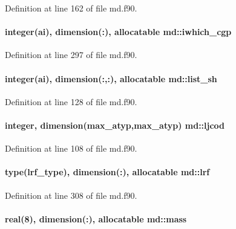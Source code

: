 Definition at line 162 of file md.\-f90.

\hypertarget{classmd_ae1eeb6fb5da11e0cbed4087c6bcd8390}{
\paragraph[{iwhich\-\_\-cgp}]{\setlength{\rightskip}{0pt plus 5cm}integer(ai), dimension(\-:), allocatable md\-::iwhich\-\_\-cgp}}\label{classmd_ae1eeb6fb5da11e0cbed4087c6bcd8390}


Definition at line 297 of file md.\-f90.

\hypertarget{classmd_a1bafa05e609654146f643daa94e4d47a}{
\paragraph[{list\-\_\-sh}]{\setlength{\rightskip}{0pt plus 5cm}integer(ai), dimension(\-:,\-:), allocatable md\-::list\-\_\-sh}}\label{classmd_a1bafa05e609654146f643daa94e4d47a}


Definition at line 128 of file md.\-f90.

\hypertarget{classmd_abdc7289478bcb65503403779b47ccbc1}{
\paragraph[{ljcod}]{\setlength{\rightskip}{0pt plus 5cm}integer, dimension({\bf max\-\_\-atyp},{\bf max\-\_\-atyp}) md\-::ljcod}}\label{classmd_abdc7289478bcb65503403779b47ccbc1}


Definition at line 108 of file md.\-f90.

\hypertarget{classmd_a17367768665a497aaa4afa1398cd791f}{
\paragraph[{lrf}]{\setlength{\rightskip}{0pt plus 5cm}type({\bf lrf\-\_\-type}), dimension(\-:), allocatable md\-::lrf}}\label{classmd_a17367768665a497aaa4afa1398cd791f}


Definition at line 308 of file md.\-f90.

\hypertarget{classmd_a189ad15cf49f9a89a65a26f2fb9783ad}{
\paragraph[{mass}]{\setlength{\rightskip}{0pt plus 5cm}real(8), dimension(\-:), allocatable md\-::mass}}\label{classmd_a189ad15cf49f9a89a65a26f2fb9783ad}


